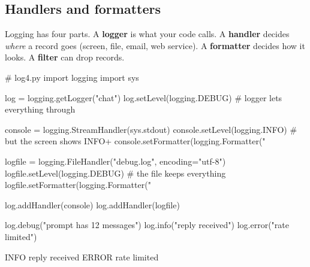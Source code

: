 \subsection{Handlers and formatters}

Logging has four parts. A \textbf{logger} is what your code calls. A \textbf{handler} decides \emph{where} a record goes
(screen, file, email, web service). A \textbf{formatter} decides how it looks. A \textbf{filter} can drop records.

\begin{center}
\end{center}

\begin{pycode}
# log4.py
import logging
import sys

log = logging.getLogger("chat")
log.setLevel(logging.DEBUG)                  # logger lets everything through

console = logging.StreamHandler(sys.stdout)
console.setLevel(logging.INFO)               # but the screen shows INFO+
console.setFormatter(logging.Formatter("%

logfile = logging.FileHandler("debug.log", encoding="utf-8")
logfile.setLevel(logging.DEBUG)              # the file keeps everything
logfile.setFormatter(logging.Formatter("%

log.addHandler(console)
log.addHandler(logfile)

log.debug("prompt has 12 messages")
log.info("reply received")
log.error("rate limited")
\end{pycode}
\begin{rawcode}
INFO reply received
ERROR rate limited
\end{rawcode}

